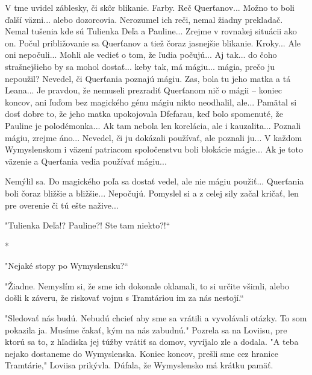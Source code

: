 \documentclass{book}
\begin{document}
V tme uvidel záblesky, či skôr blikanie. Farby. Reč Querťanov... Možno to boli ďalší väzni... alebo dozorcovia. Nerozumel ich reči, nemal žiadny prekladač. Nemal tušenia kde sú Tulienka Deľa a Pauline... Zrejme v rovnakej situácii ako on. Počul približovanie sa Querťanov a tiež čoraz jasnejšie blikanie. Kroky... Ale oni nepočuli... Mohli ale vedieť o tom, že ľudia počujú... Aj tak... do čoho strašnejšieho by sa mohol dostať... keby tak, má mágiu... mágia, prečo ju nepoužil? Nevedel, či Querťania poznajú mágiu. Zas, bola tu jeho matka a tá Leana... Je pravdou, že nemuseli prezradiť Querťanom nič o mágii – koniec koncov, ani ľuďom bez magického génu mágiu nikto neodhalil, ale... Pamätal si dosť dobre to, že jeho matka upokojovala Dfefarau, keď bolo spomenuté, že Pauline je polodémonka... Ak tam nebola len korelácia, ale i kauzalita... Poznali mágiu, zrejme áno... Nevedel, či ju dokázali používať, ale poznali ju... V každom Wymyslenskom i väzení patriacom spoločenstvu boli blokácie mágie... Ak je toto väzenie a Querťania vedia používať mágiu...

Nemýlil sa. Do magického poľa sa dostať vedel, ale nie mágiu použiť... Querťania boli čoraz bližšie a bližšie... Nepočujú. Pomyslel si a z celej sily začal kričať, len pre overenie či tú ešte nažive...

"$ $Tulienka Deľa!? Pauline?! Ste tam niekto?!“

\begin{center}

*

\end{center}

"$ $Nejaké stopy po Wymyslensku?“

"$ $Žiadne. Nemyslím si, že sme ich dokonale oklamali, to si určite všimli, alebo došli k záveru, že riskovať vojnu s Tramtáriou im za nás nestojí.“

"$ $Sledovať nás budú. Nebudú chcieť aby sme sa vrátili a vyvolávali otázky. To som pokazila ja. Musíme čakať, kým na nás zabudnú."$ $ Pozrela sa na Loviisu, pre ktorú sa to, z hľadiska jej túžby vrátiť sa domov, vyvíjalo zle a dodala. "$ $A teba nejako dostaneme do Wymyslenska. Koniec koncov, prešli sme cez hranice Tramtárie,"$ $ Loviisa prikývla. Dúfala, že Wymyslensko má krátku pamäť.
\end{document}
